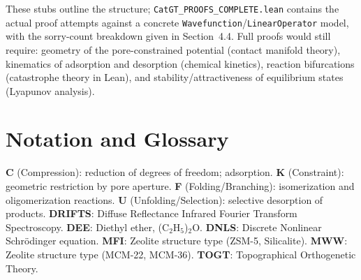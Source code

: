 \documentclass[11pt]{article}
\begin{document}
These stubs outline the structure; \texttt{CatGT\_PROOFS\_COMPLETE.lean} contains the actual proof attempts against a concrete \texttt{Wavefunction}/\texttt{LinearOperator} model, with the sorry-count breakdown given in Section~4.4. Full proofs would still require: geometry of the pore-constrained potential (contact manifold theory), kinematics of adsorption and desorption (chemical kinetics), reaction bifurcations (catastrophe theory in Lean), and stability/attractiveness of equilibrium states (Lyapunov analysis).

\section{Notation and Glossary}
\textbf{C} (Compression): reduction of degrees of freedom; adsorption. \textbf{K} (Constraint): geometric restriction by pore aperture. \textbf{F} (Folding/Branching): isomerization and oligomerization reactions. \textbf{U} (Unfolding/Selection): selective desorption of products. \textbf{DRIFTS}: Diffuse Reflectance Infrared Fourier Transform Spectroscopy. \textbf{DEE}: Diethyl ether, (C$_2$H$_5$)$_2$O. \textbf{DNLS}: Discrete Nonlinear Schr\"odinger equation. \textbf{MFI}: Zeolite structure type (ZSM-5, Silicalite). \textbf{MWW}: Zeolite structure type (MCM-22, MCM-36). \textbf{TOGT}: Topographical Orthogenetic Theory.
\end{document}
